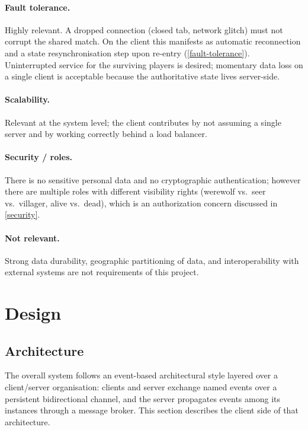 \documentclass{scrartcl}
\begin{document}
\paragraph{Fault tolerance.} Highly relevant. A dropped connection
(closed tab, network glitch) must not corrupt the shared match. On the
client this manifests as automatic reconnection and a state
resynchronisation step upon re-entry (\cref{fault-tolerance}).
Uninterrupted service for the surviving players is desired; momentary
data loss on a single client is acceptable because the authoritative
state lives server-side.

\paragraph{Scalability.} Relevant at the system level; the client
contributes by not assuming a single server and by working correctly
behind a load balancer.

\paragraph{Security / roles.} There is no sensitive personal data and no
cryptographic authentication; however there are multiple roles with
different visibility rights (werewolf vs.\ seer vs.\ villager, alive
vs.\ dead), which is an authorization concern discussed in
\cref{security}.

\paragraph{Not relevant.} Strong data durability, geographic
partitioning of data, and interoperability with external systems are
not requirements of this project.

\section{Design}\label{design}

\subsection{Architecture}\label{architecture}

The overall system follows an event-based architectural style layered
over a client/server organisation: clients and server exchange named
events over a persistent bidirectional channel, and the server
propagates events among its instances through a message broker. This
section describes the client side of that architecture.
\end{document}
